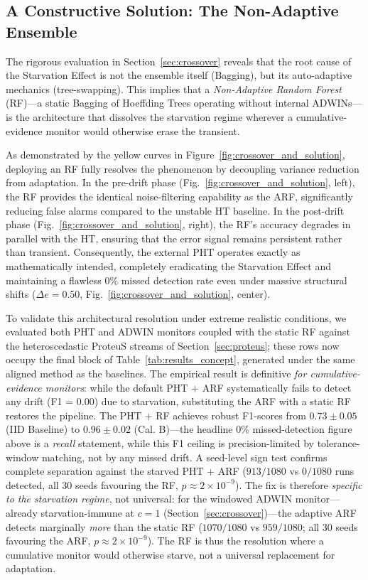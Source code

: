 \documentclass[10pt,conference]{IEEEtran}
\theoremstyle{definition}
\begin{document}


\subsection{A Constructive Solution: The Non-Adaptive Ensemble}\label{sec:solution_rf}

The rigorous evaluation in Section~\ref{sec:crossover} reveals that the root cause of the Starvation Effect is not the ensemble itself (Bagging), but its auto-adaptive mechanics (tree-swapping). This implies that a \emph{Non-Adaptive Random Forest} (RF)---a static Bagging of Hoeffding Trees operating without internal ADWINs---is the architecture that dissolves the starvation regime wherever a cumulative-evidence monitor would otherwise erase the transient.

As demonstrated by the yellow curves in Figure~\ref{fig:crossover_and_solution}, deploying an RF fully resolves the phenomenon by decoupling variance reduction from adaptation. In the pre-drift phase (Fig.~\ref{fig:crossover_and_solution}, left), the RF provides the identical noise-filtering capability as the ARF, significantly reducing false alarms compared to the unstable HT baseline. In the post-drift phase (Fig.~\ref{fig:crossover_and_solution}, right), the RF's accuracy degrades in parallel with the HT, ensuring that the error signal remains persistent rather than transient. Consequently, the external PHT operates exactly as mathematically intended, completely eradicating the Starvation Effect and maintaining a flawless $0\%$ missed detection rate even under massive structural shifts ($\Delta e = 0.50$, Fig.~\ref{fig:crossover_and_solution}, center).

To validate this architectural resolution under extreme realistic conditions, we evaluated both PHT and ADWIN monitors coupled with the static RF against the heteroscedastic ProteuS streams of Section~\ref{sec:proteus}; these rows now occupy the final block of Table~\ref{tab:results_concept}, generated under the same aligned method as the baselines. The empirical result is definitive \emph{for cumulative-evidence monitors}: while the default PHT + ARF systematically fails to detect any drift (F1 = 0.00) due to starvation, substituting the ARF with a static RF restores the pipeline. The PHT + RF achieves robust F1-scores from $0.73 \pm 0.05$ (IID Baseline) to $0.96 \pm 0.02$ (Cal. B)---the headline $0\%$ missed-detection figure above is a \emph{recall} statement, while this F1 ceiling is precision-limited by tolerance-window matching, not by any missed drift. A seed-level sign test confirms complete separation against the starved PHT + ARF ($913/1080$ vs $0/1080$ runs detected, all $30$ seeds favouring the RF, $p \approx 2 \times 10^{-9}$). The fix is therefore \emph{specific to the starvation regime}, not universal: for the windowed ADWIN monitor---already starvation-immune at $c = 1$ (Section~\ref{sec:crossover})---the adaptive ARF detects marginally \emph{more} than the static RF ($1070/1080$ vs $959/1080$; all $30$ seeds favouring the ARF, $p \approx 2 \times 10^{-9}$). The RF is thus the resolution where a cumulative monitor would otherwise starve, not a universal replacement for adaptation.
\end{document}
